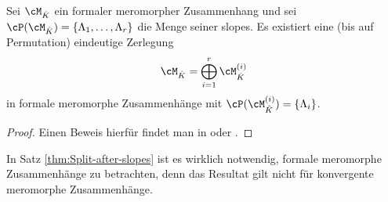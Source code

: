 \begin{thm} \label{thm:Split-after-slopes}
Sei $\cM_{\hat{K}}$ ein formaler meromorpher Zusammenhang und sei
$\cP(\cM_{\hat K})=\{\Lambda_1,\dots,\Lambda_r\}$ die Menge seiner
slopes. Es existiert eine (bis auf Permutation) eindeutige Zerlegung
\[
\cM_{\hat K}=\bigoplus_{i=1}^r\cM_{\hat K}^{(i)}
\]
in formale meromorphe Zusammenhänge
mit $\cP(\cM_{\hat K}^{(i)})=\{\Lambda_i\}$.
\end{thm}
\begin{proof}
Einen Beweis hierfür findet man in \cite[Thm 5.3.1]{sabbah_cimpa90} oder
\cite[5.15]{ZulaBarbara}.
\end{proof}
\begin{bem}
In Satz \ref{thm:Split-after-slopes} ist es wirklich notwendig, formale
meromorphe Zusammenhänge zu betrachten, denn das Resultat gilt nicht für
konvergente meromorphe Zusammenhänge.
\end{bem}
